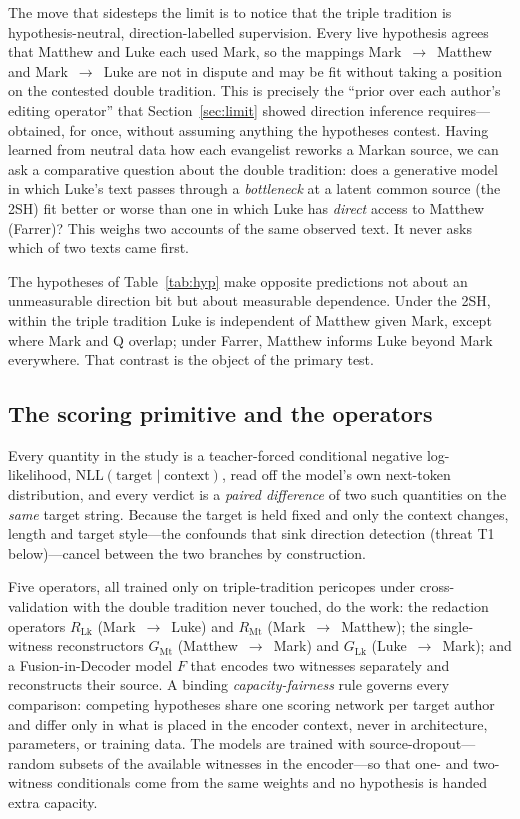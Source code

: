 \documentclass[11pt,letterpaper]{article}
\newcommand{\nll}{\mathrm{NLL}}
\begin{document}
The move that sidesteps the limit is to notice that the triple tradition is hypothesis-neutral, direction-labelled supervision. Every live hypothesis agrees that Matthew and Luke each used Mark, so the mappings Mark~$\to$~Matthew and Mark~$\to$~Luke are not in dispute and may be fit without taking a position on the contested double tradition. This is precisely the ``prior over each author's editing operator'' that Section~\ref{sec:limit} showed direction inference requires---obtained, for once, without assuming anything the hypotheses contest. Having learned from neutral data how each evangelist reworks a Markan source, we can ask a comparative question about the double tradition: does a generative model in which Luke's text passes through a \emph{bottleneck} at a latent common source (the 2SH) fit better or worse than one in which Luke has \emph{direct} access to Matthew (Farrer)? This weighs two accounts of the same observed text. It never asks which of two texts came first.

The hypotheses of Table~\ref{tab:hyp} make opposite predictions not about an unmeasurable direction bit but about measurable dependence. Under the 2SH, within the triple tradition Luke is independent of Matthew given Mark, except where Mark and Q overlap; under Farrer, Matthew informs Luke beyond Mark everywhere. That contrast is the object of the primary test.

\subsection{The scoring primitive and the operators}

Every quantity in the study is a teacher-forced conditional negative log-likelihood, $\nll(\text{target}\mid\text{context})$, read off the model's own next-token distribution, and every verdict is a \emph{paired difference} of two such quantities on the \emph{same} target string. Because the target is held fixed and only the context changes, length and target style---the confounds that sink direction detection (threat T1 below)---cancel between the two branches by construction.

Five operators, all trained only on triple-tradition pericopes under cross-validation with the double tradition never touched, do the work: the redaction operators $R_{\mathrm{Lk}}$ (Mark~$\to$~Luke) and $R_{\mathrm{Mt}}$ (Mark~$\to$~Matthew); the single-witness reconstructors $G_{\mathrm{Mt}}$ (Matthew~$\to$~Mark) and $G_{\mathrm{Lk}}$ (Luke~$\to$~Mark); and a Fusion-in-Decoder model $F$ \citep{izacard2021} that encodes two witnesses separately and reconstructs their source. A binding \emph{capacity-fairness} rule governs every comparison: competing hypotheses share one scoring network per target author and differ only in what is placed in the encoder context, never in architecture, parameters, or training data. The models are trained with source-dropout---random subsets of the available witnesses in the encoder---so that one- and two-witness conditionals come from the same weights and no hypothesis is handed extra capacity.
\end{document}
